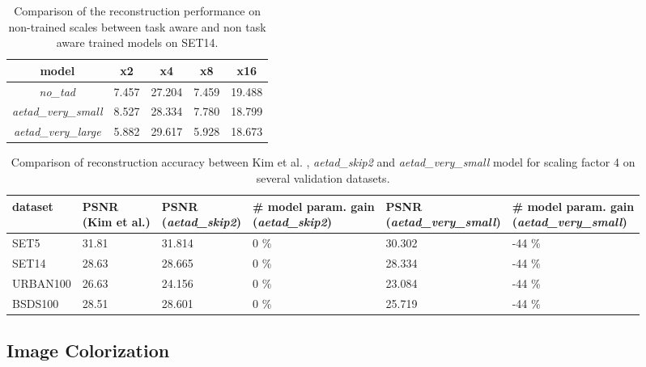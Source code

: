 \begin{table}[!htbp]
	\begin{center}
	\begin{tabular}{c|c|c|c|c}
	model & x2 & x4 & x8 & x16 \\
	\hline
  \textit{no\_tad} & 7.457 & 27.204 & 7.459 & 19.488 \\
	\textit{aetad\_very\_small} & 8.527 & 28.334 & 7.780 & 18.799 \\
	\textit{aetad\_very\_large} & 5.882 & 29.617 & 5.928 & 18.673 \\
	\end{tabular}
	\caption{Comparison of the reconstruction performance on non-trained scales
	between task aware and non task aware trained models on SET14.}
	\label{table:sisrotherscales}
	\end{center}
\end{table}


\begin{table}[!htbp]
	\begin{center}
	\footnotesize
	\begin{tabular}{p{2cm}|p{2cm}|p{2cm}|p{3cm}|p{3cm}|p{3cm}}
	dataset & \pbox{2cm}{PSNR \\(Kim et al.)}
	& \pbox{2cm}{PSNR \\ (\textit{aetad\_skip2})}
	& \pbox{3cm}{\# model param. gain \\ (\textit{aetad\_skip2})}
	& \pbox{3cm}{PSNR \\ (\textit{aetad\_very\_small})}
	& \pbox{3cm}{\# model param. gain \\ (\textit{aetad\_very\_small})} \\
	\hline
  SET5 & 31.81 & 31.814 & 0 \% & 30.302 & -44 \% \\
	SET14 & 28.63 & 28.665 & 0 \% & 28.334 & -44 \% \\
	URBAN100 & 26.63 & 24.156 & 0 \% & 23.084 & -44 \% \\
	BSDS100 & 28.51 & 28.601 & 0 \% & 25.719 & -44 \% \\
	\end{tabular}
	\caption{Comparison of reconstruction accuracy between Kim et al. \cite{TAID},
	\textit{aetad\_skip2} and \textit{aetad\_very\_small}
	model for scaling factor 4 on several validation datasets. }
	\label{table:sisperformance}
	\normalsize
	\end{center}
\end{table}

\subsection{Image Colorization}
\label{sec:Experiments_IC}


